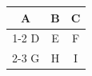 \documentclass{article}
\begin{document}
\begin{tabular}{|c|c|c|}
\hline
A & B & C \\
\cline{1-2}
D & E & F \\
\cline{2-3}
G & H & I \\
\hline
\end{tabular}
\end{document}
